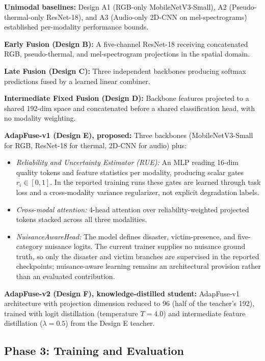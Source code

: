\textbf{Unimodal baselines:} Design A1 (RGB-only MobileNetV3-Small), A2 (Pseudo-thermal-only ResNet-18), and A3 (Audio-only 2D-CNN on mel-spectrograms) established per-modality performance bounds.

\textbf{Early Fusion (Design B):} A five-channel ResNet-18 receiving concatenated RGB, pseudo-thermal, and mel-spectrogram projections in the spatial domain.

\textbf{Late Fusion (Design C):} Three independent backbones producing softmax predictions fused by a learned linear combiner.

\textbf{Intermediate Fixed Fusion (Design D):} Backbone features projected to a shared 192-dim space and concatenated before a shared classification head, with no modality weighting.

\textbf{AdapFuse-v1 (Design E), proposed:} Three backbones (MobileNetV3-Small for RGB, ResNet-18 for thermal, 2D-CNN for audio) plus:
\begin{itemize}
    \item \textit{Reliability and Uncertainty Estimator (RUE):} An MLP reading 16-dim quality tokens and feature statistics per modality, producing scalar gates $r_i \in [0,1]$. In the reported training runs these gates are learned through task loss and a cross-modality variance regularizer, not explicit degradation labels.
    \item \textit{Cross-modal attention:} 4-head attention over reliability-weighted projected tokens stacked across all three modalities.
    \item \textit{NuisanceAwareHead:} The model defines disaster, victim-presence, and five-category nuisance logits. The current trainer supplies no nuisance ground truth, so only the disaster and victim branches are supervised in the reported checkpoints; nuisance-aware learning remains an architectural provision rather than an evaluated contribution.
\end{itemize}

\textbf{AdapFuse-v2 (Design F), knowledge-distilled student:} AdapFuse-v1 architecture with projection dimension reduced to 96 (half of the teacher's 192), trained with logit distillation (temperature $T=4.0$) and intermediate feature distillation ($\lambda=0.5$) from the Design E teacher.

\subsection{Phase 3: Training and Evaluation}

